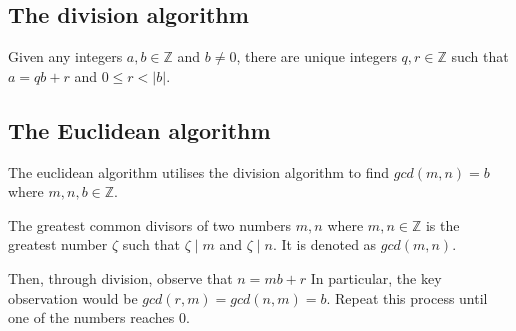 \documentclass[a4paper]{article}
\theoremstyle{plain}
\newtheorem{thm}{Theorem}[section]
\theoremstyle{definition}
\newtheorem{defn}{Definition}[section]
\theoremstyle{remark}
\begin{document}
\subsection{The division algorithm}
\begin{tcolorbox}[colback=black!3!white,colframe=black!60!white,title=\begin{thm}The division algorithm \label{The division algorithm}\end{thm}]
	Given any integers $a,b \in \mathbb{Z}$ and $b \neq 0$, there are unique integers $q,r \in \mathbb{Z}$ such that $a = qb+r$ and $0 \le r < |b|$.
\end{tcolorbox}
\subsection{The Euclidean algorithm}
The euclidean algorithm utilises the division algorithm to find $gcd(m,n)=b$ where $m,n,b \in \mathbb{Z}$.
\begin{tcolorbox}[colback=black!3!white,colframe=black!60!white,title=\begin{defn}Greatest Common Divisor \label{Greatest Common Divisor}\end{defn}]
The greatest common divisors of two numbers $m,n$ where $m,n \in \mathbb{Z}$ is the greatest number $\zeta$ such that $\zeta  \mid  m$ and $\zeta  \mid  n$. It is denoted as $gcd(m,n)$.
\end{tcolorbox}
Then, through division, observe that 
$n = mb + r$
In particular, the key observation would be $gcd(r,m) = gcd(n,m) = b$.
Repeat this process until one of the numbers reaches $0$.
\end{document}
